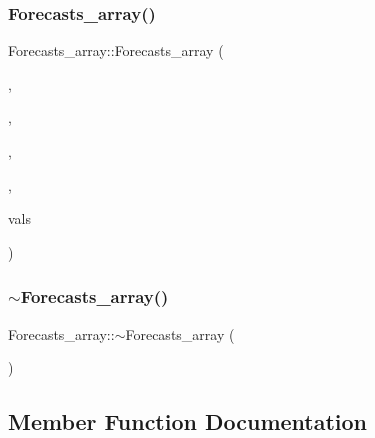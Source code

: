\mbox{\label{class_forecasts__array_ac50579e66269d92ebdbc4dc1ea07f7c8}} 
\subsubsection{\texorpdfstring{Forecasts\+\_\+array()}{Forecasts\_array()}\hspace{0.1cm}{\footnotesize\ttfamily [4/4]}}
{\footnotesize\ttfamily Forecasts\+\_\+array\+::\+Forecasts\+\_\+array (\begin{DoxyParamCaption}\item[{\mbox{\hyperlink{classanen_par_1_1_parameters}{anen\+Par\+::\+Parameters}}}]{,  }\item[{\mbox{\hyperlink{classanen_sta_1_1_stations}{anen\+Sta\+::\+Stations}}}]{,  }\item[{\mbox{\hyperlink{classanen_time_1_1_times}{anen\+Time\+::\+Times}}}]{,  }\item[{\mbox{\hyperlink{classanen_time_1_1_f_l_ts}{anen\+Time\+::\+F\+L\+Ts}}}]{,  }\item[{const std\+::vector$<$ double $>$ \&}]{vals }\end{DoxyParamCaption})}

\mbox{\label{class_forecasts__array_a7e13cb82b1ab76a45946cff992c7fff4}} 
\subsubsection{\texorpdfstring{$\sim$\+Forecasts\+\_\+array()}{~Forecasts\_array()}}
{\footnotesize\ttfamily Forecasts\+\_\+array\+::$\sim$\+Forecasts\+\_\+array (\begin{DoxyParamCaption}{ }\end{DoxyParamCaption})\hspace{0.3cm}{\ttfamily [virtual]}}



\subsection{Member Function Documentation}
\mbox{\label{class_forecasts__array_add3a617d4e63dba10bf369fe41714a24}} 
